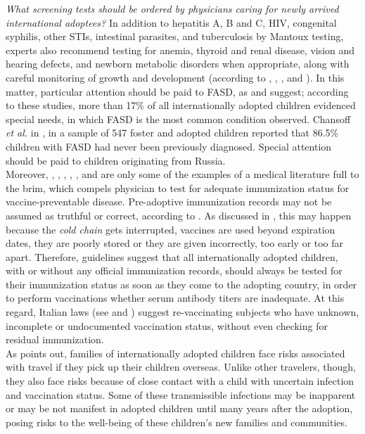 \textit{What screening tests should be ordered by physicians caring for newly arrived international adoptees?} In addition to hepatitis A, B and C, HIV, congenital syphilis, other STIs, intestinal parasites, and tuberculosis by Mantoux testing, experts also recommend testing for anemia, thyroid and renal disease, vision and hearing defects, and newborn metabolic disorders when appropriate, along with careful monitoring of growth and development (according to \cite{caringfor}, \cite{medicalscreening}, \cite{notonlyinfectious}, and \cite{nonsoloinfezioni}). In this matter, particular attention should be paid to FASD, as \cite{notonlyinfectious} and \cite{nonsoloinfezioni} suggest; according to these studies, more than 17\% of all internationally adopted children evidenced special needs, in which FASD is the most common condition observed. Chansoff \textit{et al.} in \cite{misdiagnosis}, in a sample of 547 foster and adopted children reported that 86.5\% children with FASD had never been previously diagnosed. Special attention should be paid to children originating from Russia.\\
Moreover, \cite{caringfor}, \cite{medicalscreening}, \cite{initialeval}, \cite{immunizationstatus}, \cite{comphealtheval}, and \cite{immunizationstillinsufficient} are only some of the examples of a medical literature full to the brim, which compels physician to test for adequate immunization status for vaccine-preventable disease. Pre-adoptive immunization records may not be assumed as truthful or correct, according to \cite{immunizationstatus}. As discussed in \cite{comphealtheval}, this may happen because the \textit{cold chain} gets interrupted, vaccines are used beyond expiration dates, they are poorly stored or they are given incorrectly, too early or too far apart. Therefore, guidelines suggest that all internationally adopted children, with or without any official immunization records, should always be tested for their immunization status as soon as they come to the adopting country, in order to perform vaccinations whether serum antibody titers are inadequate. At this regard, Italian laws (see \cite{circolareministeriale} and \cite{centroprevenzione}) suggest re-vaccinating subjects who have unknown, incomplete or undocumented vaccination status, without even checking for residual immunization.\\
As \cite{preventing} points out, families of internationally adopted children face risks associated with travel if they pick up their children overseas. Unlike other travelers, though, they also face risks because of close contact with a child with uncertain infection and vaccination status. Some of these transmissible infections may be inapparent or may be not manifest in adopted children until many years after the adoption, posing risks to the well-being of these children's new families and communities.

